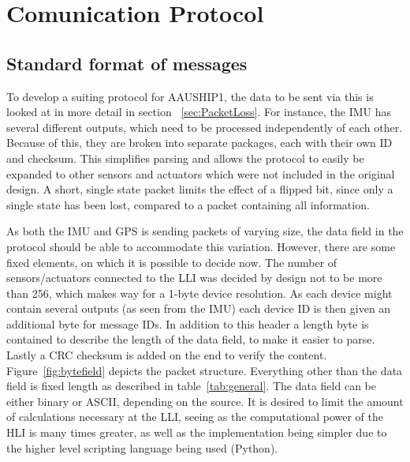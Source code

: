 \chapter{Comunication Protocol}
\label{chap:Protocol}
\section{Standard format of messages}

To develop a suiting protocol for AAUSHIP1, the data to be sent via this is looked at in more detail in section ~\vref{sec:PacketLoss}. For instance, the \ac{IMU} has several different outputs, which need to be processed independently of each other. Because of this, they are broken into separate packages, each with their own ID and checksum. This simplifies parsing and allows the protocol to easily be expanded to other sensors and actuators which were not included in the original design. A short, single state packet limits the effect of a flipped bit, since only a single state has been lost, compared to a packet containing all information.

As both the \ac{IMU} and \ac{GPS} is sending packets of varying size, the data field in the protocol should be able to accommodate this variation. However, there are some fixed elements, on which it is possible to decide now. The number of sensors/actuators connected to the \ac{LLI} was decided by design not to be more than 256, which makes way for a 1-byte device resolution. As each device might contain several outputs (as seen from the \ac{IMU}) each device ID is then given an additional byte for message IDs. In addition to this header a length byte is contained to describe the length of the data field, to make it easier to parse. Lastly a \ac{CRC} checksum is added on the end to verify the content. Figure~\vref{fig:bytefield} depicts the packet structure. Everything other than the data field is fixed length as described in table~\vref{tab:general}. 
The data field can be either binary or ASCII, depending on the source. It is desired to limit the amount of calculations necessary at the LLI, seeing as the computational power of the HLI is many times greater, as well as the implementation being simpler due to the higher level scripting language being used (Python).

